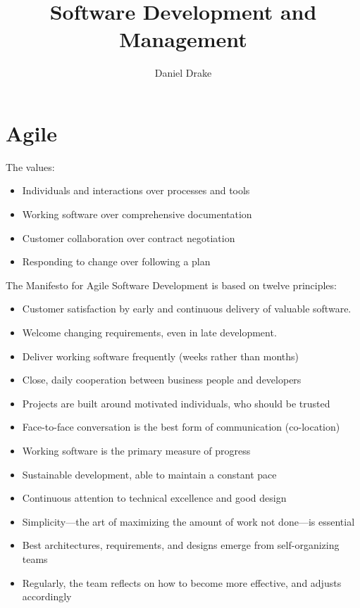 \documentclass[12pt]{extarticle}
\title{Software Development and Management}
\author{Daniel Drake}
\theoremstyle{plain}
\theoremstyle{Definition}
\theoremstyle{Definition}
\theoremstyle{plain}
\begin{document}
		\maketitle			
		\section{Agile}
		 The values:
		\begin{itemize}
			\item Individuals and interactions over processes and tools
			\item Working software over comprehensive documentation
			\item Customer collaboration over contract negotiation
			\item Responding to change over following a plan 
		\end{itemize}
		The Manifesto for Agile Software Development is based on twelve principles:
		\begin{itemize}
			\item Customer satisfaction by early and continuous delivery of valuable software.
			\item Welcome changing requirements, even in late development.
			\item Deliver working software frequently (weeks rather than months)
			\item Close, daily cooperation between business people and developers
			\item Projects are built around motivated individuals, who should be trusted
			\item Face-to-face conversation is the best form of communication (co-location)
			\item Working software is the primary measure of progress
			\item Sustainable development, able to maintain a constant pace
			\item Continuous attention to technical excellence and good design
			\item Simplicity—the art of maximizing the amount of work not done—is essential
			\item Best architectures, requirements, and designs emerge from self-organizing teams
			\item Regularly, the team reflects on how to become more effective, and adjusts accordingly
		\end{itemize}
			
			
			
			
			
			

		
		
\end{document}
